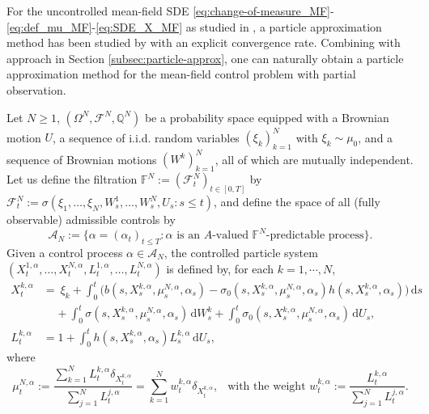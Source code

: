 \documentclass[11pt]{article}
\numberwithin{equation}{section}
\theoremstyle{plain}
\theoremstyle{definition}
\theoremstyle{remark}
\newcommand{\dd}{\mathrm{d}}
\newcommand{\Ac}{\mathcal{A}}
\begin{document}
	For the uncontrolled mean-field SDE \eqref{eq:change-of-measure_MF}-\eqref{eq:def_mu_MF}-\eqref{eq:SDE_X_MF} as studied in \cite{buckdahn2023general},
	a particle approximation method has been studied by \cite{du2024particle} with an explicit convergence rate.
	Combining with approach in Section \ref{subsec:particle-approx}, one can naturally obtain a particle approximation method for the mean-field control problem with partial observation.
	
	\vspace{0.5em}
	
	Let $N \ge 1$, $(\Omega^N, \mathcal{F}^N, \mathbb{Q}^N)$ be a probability space equipped with a Brownian motion $U$, a sequence of i.i.d. random variables $(\xi_k)_{k=1}^N$ with $\xi_k \sim \mu_0$, and a sequence of Brownian motions $(W^k)_{k=1}^N$, all of which are mutually independent. 
	Let us define the filtration $\mathbb{F}^N:=(\mathcal{F}_t^N)_{t\in [0,T]}$ by $\mathcal{F}_t^N:=\sigma(\xi_1,\dots, \xi_N, W_s^1,\dots, W_s^N, U_s: s\le t)$,
	and define the space of all (fully observable) admissible controls by 
	\begin{equation*}
		\mathcal{A}_N := \{\alpha = (\alpha_t)_{t\le T}: \alpha \text{ is an }A\text{-valued } \mathbb{F}^{N}\text{-predictable process}\}.
	\end{equation*}
	Given a control process $\alpha \in \Ac_N$, the controlled particle system $(X_t^{1,\alpha}, \dots, X_t^{N,\alpha}, L_t^{1,\alpha}, \dots, L_t^{N,\alpha})$ is defined by,
	for each $k = 1, \cdots, N$,
	\begin{align}
		X_t^{k,\alpha} &=~ \xi_k + \int_0^t \Big(b(s, X_s^{k,\alpha}, \mu_s^{N,\alpha}, \alpha_s) - \sigma_0(s,X_s^{k,\alpha}, \mu_s^{N,\alpha}, \alpha_s) h(s, X_s^{k,\alpha}, \alpha_s) \Big) \,\dd s \nonumber \\
		&~~~~~+ \int_0^t \sigma(s,X_s^{k,\alpha}, \mu_s^{N,\alpha}, \alpha_s)\,\dd W_s^{k} + \int_0^t \sigma_0(s, X_s^{k, \alpha}, \mu_s^{N, \alpha}, \alpha_s)\,\dd U_s, \label{eq:SDE_XN_MF} \\
		L_t^{k,\alpha} &= 1 + \int_0^t  h(s, X_s^{k,\alpha}, \alpha_s) L_s^{k,\alpha} \,\dd U_s, \label{eq:SDE_LN_MF}
	\end{align}
	where
	\begin{equation} \label{eq:def_muN_MF}
		\mu_t^{N,\alpha} := \frac{\sum_{k=1}^N L_t^{k,\alpha} \delta_{X_t^{k,\alpha}}}{\sum_{j=1}^N L_t^{j,\alpha}} = \sum_{k=1}^N w_t^{k,\alpha} \delta_{X_t^{k,\alpha}},
		~~\text{ with the weight }w_t^{k,\alpha}:= \frac{L_t^{k,\alpha}}{\sum_{j=1}^N L_t^{j,\alpha}}. 
	\end{equation}
	
\end{document}
